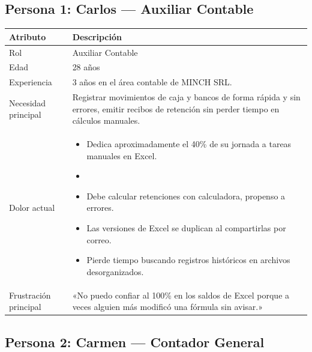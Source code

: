 \documentclass[stu]{apa7}
\begin{document}
\subsection{Persona 1: Carlos --- Auxiliar Contable}

\begin{longtable}{|L{3.5cm}|L{11cm}|}
\hline
{}
\textbf{Atributo} & \textbf{Descripción} \\
\hline
Rol & Auxiliar Contable \\
\hline
Edad & 28 años \\
\hline
Experiencia & 3 años en el área contable de MINCH SRL. \\
\hline
Necesidad principal & Registrar movimientos de caja y bancos de forma rápida y sin errores, emitir recibos de retención sin perder tiempo en cálculos manuales. \\
\hline
Dolor actual & 
\begin{itemize}[nosep]
    \item Dedica aproximadamente el 40\% de su jornada a tareas manuales en Excel.
    \item
    \item Debe calcular retenciones con calculadora, propenso a errores.
    \item Las versiones de Excel se duplican al compartirlas por correo.
    \item Pierde tiempo buscando registros históricos en archivos desorganizados.
\end{itemize} \\
\hline
Frustración principal & «No puedo confiar al 100\% en los saldos de Excel porque a veces alguien más modificó una fórmula sin avisar.» \\
\hline
\end{longtable}

\subsection{Persona 2: Carmen --- Contador General}
\end{document}
